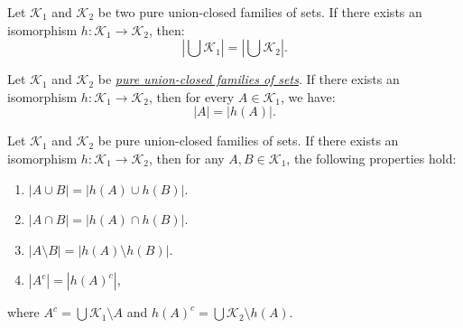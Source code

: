 \documentclass{beamer}
\begin{document}
\begin{frame}
	\begin{corollary}[2.1]
		Let \( \mathcal{K}_1 \) and \( \mathcal{K}_2 \) be two pure union-closed families of sets. If there exists an isomorphism \( h: \mathcal{K}_1 \to \mathcal{K}_2 \), then:
		\[
			\left|\bigcup \mathcal{K}_1\right| = \left|\bigcup \mathcal{K}_2\right|.
		\]
	\end{corollary}
	\vfill
	\pause
	\begin{theorem}[Cardinality]
		Let \( \mathcal{K}_1 \) and \( \mathcal{K}_2 \) be \textit{\hyperref[def:pure_collection]{pure union-closed families of sets}}. If there exists an isomorphism \( h: \mathcal{K}_1 \to \mathcal{K}_2 \), then for every \( A \in \mathcal{K}_1 \), we have:
		\[
			|A| = |h(A)|.
		\]
	\end{theorem}


\end{frame}

\begin{frame}
	\begin{corollary}[2.2]
		Let \( \mathcal{K}_1 \) and \( \mathcal{K}_2 \) be pure union-closed families of sets. If there exists an isomorphism \( h: \mathcal{K}_1 \to \mathcal{K}_2 \), then for any \(A, B \in \mathcal{K}_1\), the following properties hold:
		\begin{enumerate}
			\item \(|A \cup B| = |h(A) \cup h(B)|\).
			\item \(|A \cap B| = |h(A) \cap h(B)|\).
			\item \(|A \setminus B| = |h(A) \setminus h(B)|\).
			\item \(|A^c| = |h{(A)}^c|\),
		\end{enumerate}
		where \(A^c = \bigcup \mathcal{K}_1 \setminus A\) and
		\(h{(A)}^c = {\bigcup \mathcal{K}_2} \setminus h(A)\).

	\end{corollary}
\end{frame}
\end{document}
